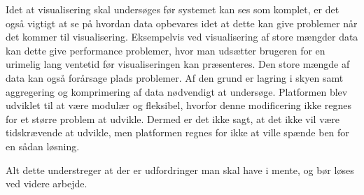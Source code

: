 Idet at visualisering skal undersøges før systemet kan ses som komplet, er det også vigtigt at se på hvordan data opbevares idet at dette kan give problemer når det kommer til visualisering. 
Eksempelvis ved visualisering af store mængder data kan dette give performance problemer, hvor man udsætter brugeren for en urimelig lang ventetid før visualiseringen kan præsenteres. 
Den store mængde af data kan også forårsage plads problemer. 
Af den grund er lagring i skyen samt aggregering og komprimering af data nødvendigt at undersøge.
Platformen blev udviklet til at være modulær og fleksibel, hvorfor denne modificering ikke regnes for et større problem at udvikle.
Dermed er det ikke sagt, at det ikke vil være tidskrævende at udvikle, men platformen regnes for ikke at ville spænde ben for en sådan løsning.

Alt dette understreger at der er udfordringer man skal have i mente, og bør løses ved videre arbejde.